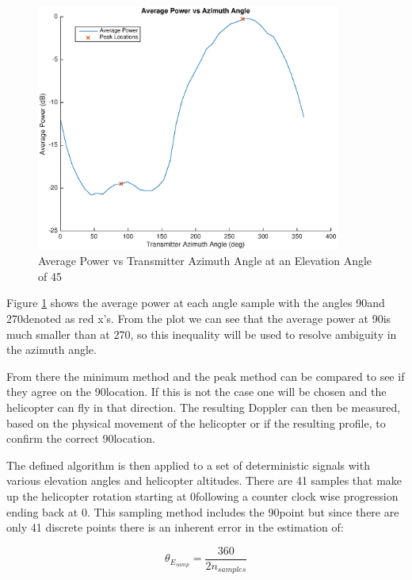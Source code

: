 \begin{figure}
	\begin{center}
		\includegraphics[width=10cm]{images/results/average_power_vs_Azimuth.eps}
		\caption{Average Power vs Transmitter Azimuth Angle at an Elevation Angle of 45\textdegree}
		\label{fig:ave_power}
	\end{center}
\end{figure}

Figure \ref{fig:ave_power}  shows the average power at each angle sample with the angles 90\textdegree \space and 270\textdegree \space denoted as red x's. From the plot we can see that the average power at 90\textdegree \space is much smaller than at 270\textdegree, so this inequality will be used to resolve ambiguity in the azimuth angle. 

From there the minimum method and the peak method can be compared to see if they agree on the 90\textdegree \space location. If this is not the case one will be chosen and the helicopter can fly in that direction. The resulting Doppler can then be measured, based on the physical movement of the helicopter or if the resulting profile, to confirm the correct 90\textdegree \space location. 

The defined algorithm is then applied to a set of deterministic signals with various elevation angles and helicopter altitudes. There are 41 samples that make up the helicopter rotation starting at 0\textdegree \space following a counter clock wise progression ending back at 0\textdegree. This sampling method includes the 90\textdegree \space point but since there are only 41 discrete points there is an inherent error in the estimation of:

\begin{equation}
	\theta_{E_{samp}} = \frac{360}{2 n_{samples}}
	\label{eqn:samp_error}
\end{equation}


